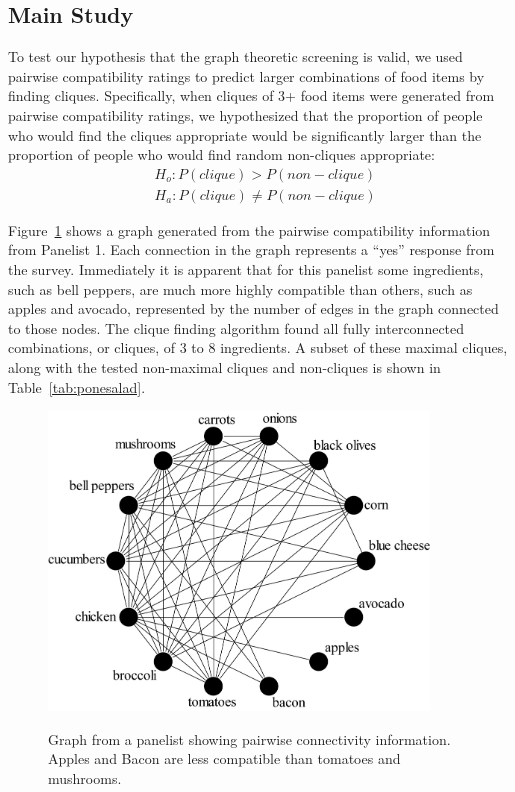 \subsection{Main Study}
To test our hypothesis that the graph theoretic screening is valid, we used pairwise compatibility ratings to predict larger combinations of food items by finding cliques.  Specifically, when cliques of 3+ food items were generated from pairwise compatibility ratings, we hypothesized that the proportion of people who would find the cliques appropriate would be significantly larger than the proportion of people who would find random non-cliques appropriate:  
\begin{align*}
 & H_o: P(clique) > P(non-clique)\\ 
 & H_a: P(clique) \neq P(non-clique)
\end{align*}

Figure~\ref{fig:saladgraph} shows a graph generated from the pairwise compatibility information from Panelist 1.  Each connection in the graph represents a “yes” response from the survey.  Immediately it is apparent that for this panelist some ingredients, such as bell peppers, are much more highly compatible than others, such as apples and avocado, represented by the number of edges in the graph connected to those nodes.  The clique finding algorithm found all fully interconnected combinations, or cliques, of 3 to 8 ingredients.  A subset of these maximal cliques, along with the tested non-maximal cliques and non-cliques is shown in Table~\ref{tab:ponesalad}.

\begin{figure}[h!]
\caption[A panelist's salad graph.]{Graph from a panelist showing pairwise connectivity information.  Apples and Bacon are less compatible than tomatoes and mushrooms.}
\centering
\includegraphics[width=0.9\textwidth]{./img/ind_super_pairgraph.png}
\label{fig:saladgraph}
\end{figure}

